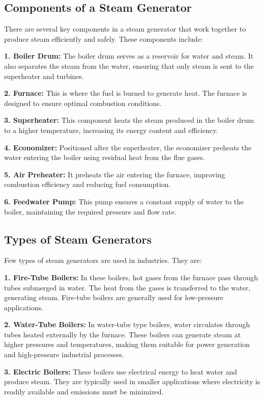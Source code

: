 \subsection{Components of a Steam Generator}
There are several key components in a steam generator that work together to produce steam efficiently and safely. These components include:

\textbf{1. Boiler Drum:} The boiler drum serves as a reservoir for water and steam. It also separates the steam from the water, ensuring that only steam is sent to the superheater and turbines.

\textbf{2. Furnace:} This is where the fuel is burned to generate heat. The furnace is designed to ensure optimal combustion conditions.

\textbf{3. Superheater:} This component heats the steam produced in the boiler drum to a higher temperature, increasing its energy content and efficiency.

\textbf{4. Economizer:} Positioned after the superheater, the economizer preheats the water entering the boiler using residual heat from the flue gases.

\textbf{5. Air Preheater:} It preheats the air entering the furnace, improving combustion efficiency and reducing fuel consumption.

\textbf{6. Feedwater Pump:} This pump ensures a constant supply of water to the boiler, maintaining the required pressure and flow rate.

\subsection{Types of Steam Generators}
Few types of steam generators are used in industries. They are:

\textbf{1. Fire-Tube Boilers:} In these boilers, hot gases from the furnace pass through tubes submerged in water. The heat from the gases is transferred to the water, generating steam. Fire-tube boilers are generally used for low-pressure applications.

\textbf{2. Water-Tube Boilers:} In water-tube type boilers, water circulates through tubes heated externally by the furnace. These boilers can generate steam at higher pressures and temperatures, making them suitable for power generation and high-pressure industrial processes.

\textbf{3. Electric Boilers:} These boilers use electrical energy to heat water and produce steam. They are typically used in smaller applications where electricity is readily available and emissions must be minimized.

